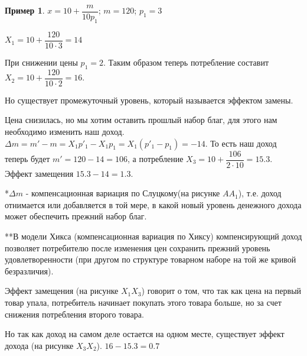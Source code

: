 \documentclass[reqno]{article}
\theoremstyle{definition}
\theoremstyle{definition}
\theoremstyle{definition}
\newtheorem*{exmp}{Пример}
\theoremstyle{definition}
\theoremstyle{definition}
\theoremstyle{definition}
\theoremstyle{definition}
\theoremstyle{definition}
\theoremstyle{definition}
\begin{document}
	\begin{exmp}
		
		$x=10+\dfrac{m}{10 p_1}$; $m=120$; $p_1 =3$
		
		$X_1 = 10 + \dfrac{120}{10 \cdot 3} = 14$
		
		При снижении цены $p_1 = 2$. Таким образом теперь потребление составит $X_2 =10+\dfrac{120}{10 \cdot 2} = 16$.
		
		Но существует промежуточный уровень, который называется эффектом замены.
		
		Цена снизилась, но мы хотим оставить прошлый набор благ, для этого нам необходимо изменить наш доход. $\Delta m = m' - m = X_1 p'_1 - X_1 p_1 = X_1 (p'_1 - p_1) = -14$. То есть наш доход теперь будет $m' = 120 - 14 = 106$, а потребление $X_3 = 10 + \dfrac{106}{2 \cdot 10} = 15.3$. Эффект замещения $15.3-14=1.3$.
		
		*$\Delta m$ - компенсационная вариация по Слуцкому(на рисунке $A A_1$), т.е. доход отнимается или добавляется в той мере, в какой новый уровень денежного дохода может обеспечить прежний набор благ. 
		
		**В модели Хикса (компенсационная вариация по Хиксу) компенсирующий доход позволяет потребителю после изменения цен сохранить прежний уровень удовлетворенности (при другом по структуре товарном наборе на той же кривой безразличия).
		
		Эффект замещения (на рисунке $X_1 X_3$) говорит о том, что так как цена на первый товар упала, потребитель начинает покупать этого товара больше, но за счет снижения потребления второго товара. 
		
		Но так как доход на самом деле остается на одном месте, существует эффект дохода (на рисунке $X_3 X_2$). $16-15.3=0.7$
		
	\end{exmp}
	
	
\end{document}
